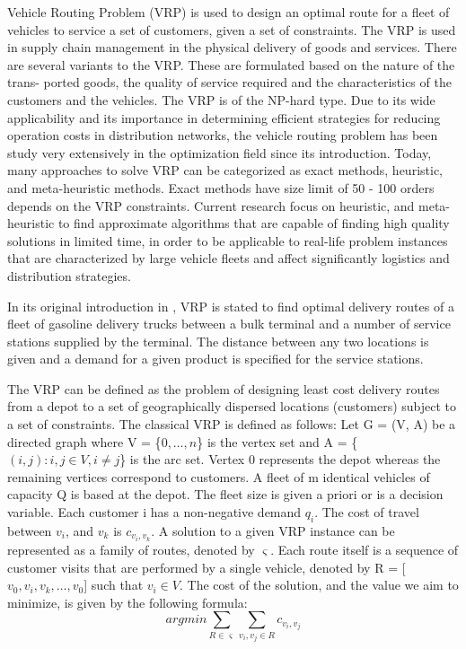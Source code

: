 \documentclass[../main.tex]{}
\begin{document}
 Vehicle Routing Problem (VRP) is used to design an optimal route for a fleet of vehicles to service a set of customers, given a set of constraints. The VRP is used in supply chain management in the physical delivery of goods and services. There are several variants to the VRP. These are formulated based on the nature of the trans- ported goods, the quality of service required and the characteristics of the customers and the vehicles. The VRP is of the NP-hard type.
Due to its wide applicability and its importance in determining efficient strategies for reducing operation costs in distribution networks, the vehicle routing problem has been study very extensively in the optimization field since its introduction. Today, many approaches to solve VRP can be categorized as exact methods, heuristic, and meta-heuristic methods. Exact methods have size limit of 50 - 100 orders depends on the VRP constraints. Current research focus on heuristic, and meta-heuristic to find approximate algorithms that are capable of finding high quality solutions in limited time, in order to be applicable to real-life problem instances that are characterized by large vehicle fleets and affect significantly logistics and distribution strategies.

In its original introduction in \cite{ref:org_vrp}, VRP is stated to find optimal delivery routes of a fleet of gasoline delivery trucks between a bulk terminal and a number of service stations supplied by the terminal. The distance between any two locations is given and a demand for a given product is specified for the service stations.

The VRP can be defined as the problem of designing least cost delivery routes from a depot to a set of geographically dispersed locations (customers) subject to a set of constraints.
The classical VRP is defined as follows: Let G = (V, A) be a directed graph where V = \{$0, \ldots ,n$\} is the vertex set and A = \{$(i,j) : i,j \in V, i \neq j$\} is the arc set. Vertex 0 represents the depot whereas the remaining vertices correspond to customers. A fleet of m identical vehicles of capacity Q is based at the depot. The fleet size is given a priori or is a decision variable. Each customer i has a non-negative demand $q_i$. The cost of travel between $v_i$, and $v_k$ is $c_{v_i, v_k}$. A solution to a given VRP instance can be represented as a family of routes, denoted by $\varsigma$. Each route itself is a sequence of customer visits that are performed by a single vehicle, denoted by R = [$v_0,v_i, v_k, \ldots, v_0$] such that $v_i \in V$. The cost of the solution, and the value we aim to minimize, is given by the following formula:
\begin{equation}
argmin \sum_{R \in \varsigma} \sum_{v_i, v_j \in R} c_{v_i, v_j} \nonumber
\end{equation}
\end{document}
